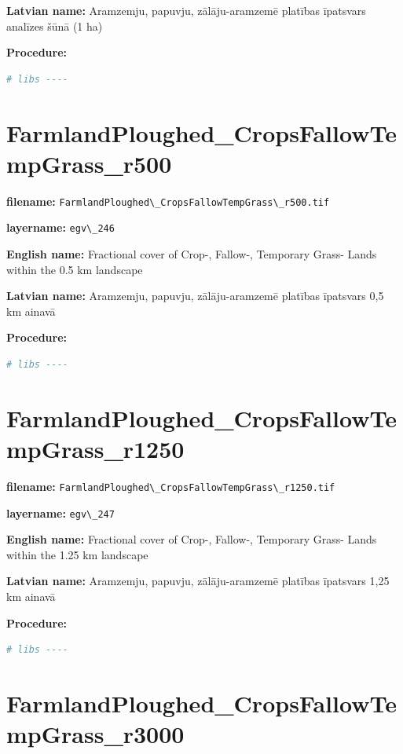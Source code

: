 \documentclass[
]{book}
\newcommand{\passthrough}[1]{#1}
\begin{document}
\textbf{Latvian name:} Aramzemju, papuvju, zālāju-aramzemē platības īpatsvars analīzes šūnā (1 ha)

\textbf{Procedure:}

\begin{lstlisting}[language=R]
# libs ----
\end{lstlisting}

\section{FarmlandPloughed\_CropsFallowTempGrass\_r500}\label{ch06.246}

\textbf{filename:} \passthrough{\lstinline!FarmlandPloughed\_CropsFallowTempGrass\_r500.tif!}

\textbf{layername:} \passthrough{\lstinline!egv\_246!}

\textbf{English name:} Fractional cover of Crop-, Fallow-, Temporary Grass- Lands within the 0.5 km landscape

\textbf{Latvian name:} Aramzemju, papuvju, zālāju-aramzemē platības īpatsvars 0,5 km ainavā

\textbf{Procedure:}

\begin{lstlisting}[language=R]
# libs ----
\end{lstlisting}

\section{FarmlandPloughed\_CropsFallowTempGrass\_r1250}\label{ch06.247}

\textbf{filename:} \passthrough{\lstinline!FarmlandPloughed\_CropsFallowTempGrass\_r1250.tif!}

\textbf{layername:} \passthrough{\lstinline!egv\_247!}

\textbf{English name:} Fractional cover of Crop-, Fallow-, Temporary Grass- Lands within the 1.25 km landscape

\textbf{Latvian name:} Aramzemju, papuvju, zālāju-aramzemē platības īpatsvars 1,25 km ainavā

\textbf{Procedure:}

\begin{lstlisting}[language=R]
# libs ----
\end{lstlisting}

\section{FarmlandPloughed\_CropsFallowTempGrass\_r3000}\label{ch06.248}
\end{document}
